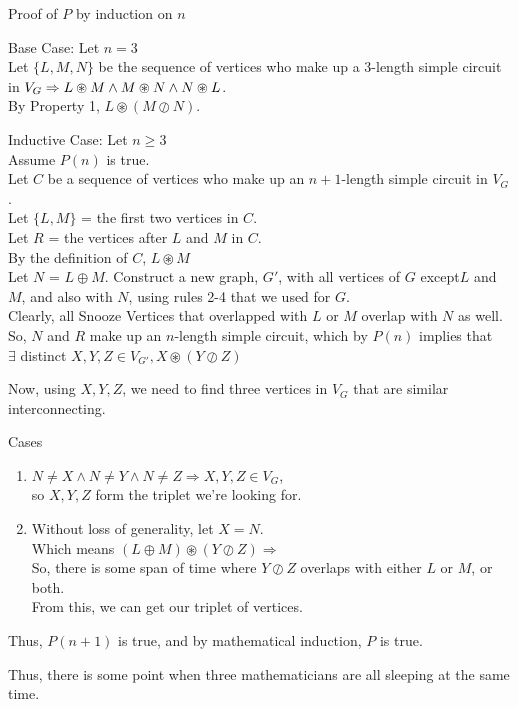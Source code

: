 \documentclass[fleqn]{article}
\begin{document}
Proof of $P$ by induction on $n$

Base Case: Let $n = 3$\\
Let $\lbrace L, M, N \rbrace$ be the sequence of vertices who make up a 3-length simple circuit in $V_G \Rightarrow\\
L \circledast M \wedge M \circledast N \wedge N \circledast L$.\\
By Property 1, $L \circledast (M \oslash N)$.

Inductive Case: Let $n \geq 3$\\
Assume $P(n)$ is true.\\
Let $C$ be a sequence of vertices who make up an $n+1$-length simple circuit in $V_G$.\\
Let $\lbrace L,M \rbrace$ = the first two vertices in $C$.\\
Let $R$ = the vertices after $L$ and $M$ in $C$.\\
By the definition of $C$, $L \circledast M$\\
Let $N$ = $L \oplus M$.
Construct a new graph, $G'$, with all vertices of $G$ except$L$ and $M$, and also with $N$, using rules 2-4 that we used for $G$.\\
Clearly, all Snooze Vertices that overlapped with $L$ or $M$ overlap with $N$ as well.\\
So, $N$ and $R$ make up an $n$-length simple circuit, which by $P(n)$ implies that\\
$\exists$ distinct $X,Y,Z \in V_{G'},
              X \circledast (Y \oslash Z)$

Now, using $X,Y,Z$, we need to find three vertices in $V_G$ that are similar interconnecting.

Cases
\begin{enumerate}
  \item $N \not= X \wedge N \not= Y \wedge N \not= Z \Rightarrow
        X,Y,Z \in V_G$,\\
        so $X,Y,Z$ form the triplet we're looking for.

  \item Without loss of generality, let $X = N$.\\
        Which means $(L \oplus M) \circledast (Y \oslash Z) \Rightarrow$\\
        So, there is some span of time where $Y \oslash Z$ overlaps
        with either $L$ or $M$, or both.\\
        From this, we can get our triplet of vertices.
\end{enumerate}
Thus, $P(n+1)$ is true, and by mathematical induction, $P$ is true.

Thus, there is some point when three mathematicians are all sleeping at the same time.
\end{document}
